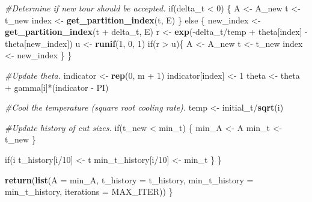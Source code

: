 \documentclass[11pt,]{article}
\newenvironment{Shaded}{\begin{snugshade}}{\end{snugshade}}
\newcommand{\KeywordTok}[1]{\textcolor[rgb]{0.13,0.29,0.53}{\textbf{{#1}}}}
\newcommand{\DataTypeTok}[1]{\textcolor[rgb]{0.13,0.29,0.53}{{#1}}}
\newcommand{\DecValTok}[1]{\textcolor[rgb]{0.00,0.00,0.81}{{#1}}}
\newcommand{\StringTok}[1]{\textcolor[rgb]{0.31,0.60,0.02}{{#1}}}
\newcommand{\CommentTok}[1]{\textcolor[rgb]{0.56,0.35,0.01}{\textit{{#1}}}}
\newcommand{\NormalTok}[1]{{#1}}
\begin{document}
\begin{Shaded}
\begin{Highlighting}[]
{{{    \CommentTok{#Determine if new tour should be accepted.}
    \NormalTok{if(delta_t <}\StringTok{ }\DecValTok{0}\NormalTok{) \{ }
      \NormalTok{A <-}\StringTok{ }\NormalTok{A_new}
      \NormalTok{t <-}\StringTok{ }\NormalTok{t_new}
      \NormalTok{index <-}\StringTok{ }\KeywordTok{get_partition_index}\NormalTok{(t, E)}
    \NormalTok{\} else \{}
      \NormalTok{new_index <-}\StringTok{ }\KeywordTok{get_partition_index}\NormalTok{(t +}\StringTok{ }\NormalTok{delta_t, E)}
      \NormalTok{r <-}\StringTok{ }\KeywordTok{exp}\NormalTok{(-delta_t/temp +}\StringTok{ }\NormalTok{theta[index] -}\StringTok{ }\NormalTok{theta[new_index])}
      \NormalTok{u <-}\StringTok{ }\KeywordTok{runif}\NormalTok{(}\DecValTok{1}\NormalTok{, }\DecValTok{0}\NormalTok{, }\DecValTok{1}\NormalTok{) }
      \NormalTok{if(r >}\StringTok{ }\NormalTok{u)\{}
        \NormalTok{A <-}\StringTok{ }\NormalTok{A_new}
        \NormalTok{t <-}\StringTok{ }\NormalTok{t_new}
        \NormalTok{index <-}\StringTok{ }\NormalTok{new_index}
      \NormalTok{\} }
    \NormalTok{\}}
    
    \CommentTok{#Update theta.}
    \NormalTok{indicator <-}\StringTok{ }\KeywordTok{rep}\NormalTok{(}\DecValTok{0}\NormalTok{, m +}\StringTok{ }\DecValTok{1}\NormalTok{)}
    \NormalTok{indicator[index] <-}\StringTok{ }\DecValTok{1}
    \NormalTok{theta <-}\StringTok{ }\NormalTok{theta +}\StringTok{ }\NormalTok{gamma[i]*(indicator -}\StringTok{ }\NormalTok{PI)}
    
    \CommentTok{#Cool the temperature (square root cooling rate).}
    \NormalTok{temp <-}\StringTok{ }\NormalTok{initial_t/}\KeywordTok{sqrt}\NormalTok{(i)}
    
    \CommentTok{#Update history of cut sizes.}
    \NormalTok{if(t_new <}\StringTok{ }\NormalTok{min_t) \{}
      \NormalTok{min_A <-}\StringTok{ }\NormalTok{A      }
      \NormalTok{min_t <-}\StringTok{ }\NormalTok{t_new}
    \NormalTok{\}}
    \NormalTok{if(i %
      \NormalTok{t_history[i/}\DecValTok{10}\NormalTok{] <-}\StringTok{ }\NormalTok{t}
      \NormalTok{min_t_history[i/}\DecValTok{10}\NormalTok{] <-}\StringTok{ }\NormalTok{min_t}
    \NormalTok{\}}
  \NormalTok{\}}
  
  \KeywordTok{return}\NormalTok{(}\KeywordTok{list}\NormalTok{(}\DataTypeTok{A =} \NormalTok{min_A, }\DataTypeTok{t_history =} \NormalTok{t_history, }
              \DataTypeTok{min_t_history =} \NormalTok{min_t_history, }
              \DataTypeTok{iterations =} \NormalTok{MAX_ITER))}
\NormalTok{\}}


}}}}
\end{Highlighting}
\end{Shaded}
\end{document}
